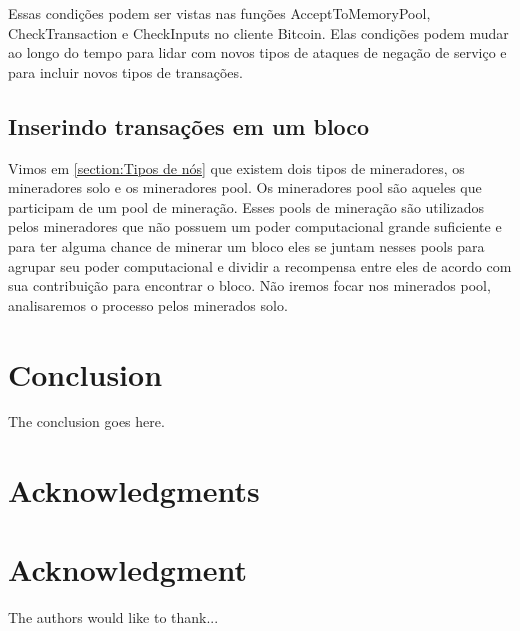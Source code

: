 \documentclass[conference,compsoc]{IEEEtran}
\begin{document}
Essas condições podem ser vistas nas funções AcceptToMemoryPool, CheckTransaction e CheckInputs no cliente Bitcoin. Elas condições podem mudar ao longo do tempo para lidar com novos tipos de ataques de negação de serviço e para incluir novos tipos de transações.

\subsection*{Inserindo transações em um bloco}
Vimos em \ref{section:Tipos de nós} que existem dois tipos de mineradores, os mineradores solo e os mineradores pool. Os mineradores pool são aqueles que participam de um pool de mineração. Esses pools de mineração são utilizados pelos mineradores que não possuem um poder computacional grande suficiente e para ter alguma chance de minerar um bloco eles se juntam nesses pools para agrupar seu poder computacional e dividir a recompensa entre eles de acordo com sua contribuição para encontrar o bloco. Não iremos focar nos minerados pool, analisaremos o processo pelos minerados solo.


\section{Conclusion}
The conclusion goes here.







\ifCLASSOPTIONcompsoc
  \section*{Acknowledgments}
\else
  \section*{Acknowledgment}
\fi


The authors would like to thank...





\end{document}
